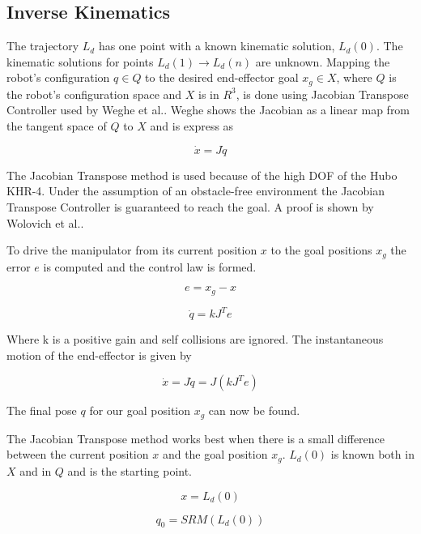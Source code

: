 \subsection{Inverse Kinematics}
The trajectory $L_d$ has one point with a known kinematic solution, $L_d(0)$.  The kinematic solutions for points $L_d(1) \rightarrow L_d(n)$ are unknown.  Mapping the robot's configuration $q \in Q$ to the desired end-effector goal $x_g \in X$, where $Q$ is the robot's configuration space and $X$ is in $R^3$, is done using Jacobian Transpose Controller used by Weghe et al.\cite{4813913}.  Weghe shows the Jacobian as a linear map from the tangent space of $Q$ to $X$ and is express as

\begin{equation}
\dot{x} = J\dot{q}
\end{equation}

  The Jacobian Transpose method is used because of the high DOF of the Hubo KHR-4.  Under the assumption of an obstacle-free environment the Jacobian Transpose Controller is guaranteed to reach the goal.  A proof is shown by Wolovich et al.\cite{4048118}.

To drive the manipulator from its current position $x$ to the goal positions $x_g$ the error $e$ is computed and the control law is formed.

\begin{equation}
e = x_g - x
\end{equation}

\begin{equation}
\dot{q} = kJ^Te
\end{equation}

Where k is a positive gain and self collisions are ignored.  The instantaneous motion of the end-effector is given by

\begin{equation}
\dot{x} = J\dot{q} = J(kJ^Te)
\end{equation}

The final pose $q$ for our goal position $x_g$ can now be found.

The Jacobian Transpose method works best when there is a small difference between the current position $x$ and the goal position $x_g$.  $L_d(0)$ is known both in $X$ and in $Q$ and is the starting point.

\begin{equation}
x = L_d(0)
\end{equation}

\begin{equation}
q_0 = SRM  \left( L_d(0) \right)
\end{equation}

